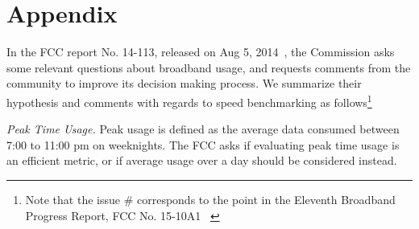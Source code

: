 \section*{Appendix}
\label{sec:issues}

In the FCC report No. 14-113, released on Aug 5, 2014~\cite{fcc2014progress-report}, the Commission asks some relevant questions about broadband usage, and requests comments from the community to improve its decision making process. We summarize their hypothesis and comments with regards to speed benchmarking as follows\footnote{Note that the issue \# corresponds to the point in the Eleventh Broadband Progress Report,
FCC No. 15-10A1 ~\cite{fcc2015progress-report}\label{foot:fcc-issue-numbers}}

 \emph{Peak Time Usage.} Peak usage is defined as the average data consumed between 7:00 to 11:00 pm on weeknights. The FCC asks if evaluating peak time usage is an efficient metric, or if average usage over a day should be considered instead.

